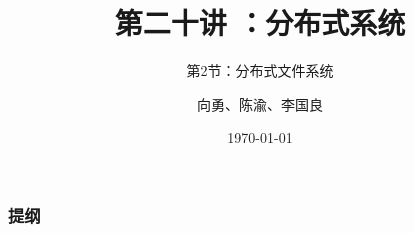 


\title[第20讲]{第二十讲 ：分布式系统} %
\subtitle{第2节：分布式文件系统}
\author{向勇、陈渝、李国良} %
\date{\today} %


    
    \begin{frame}
        \titlepage %
    \end{frame}
    
    \begin{frame}
        \frametitle{提纲} %
        \tableofcontents %
        
        
    \end{frame}
